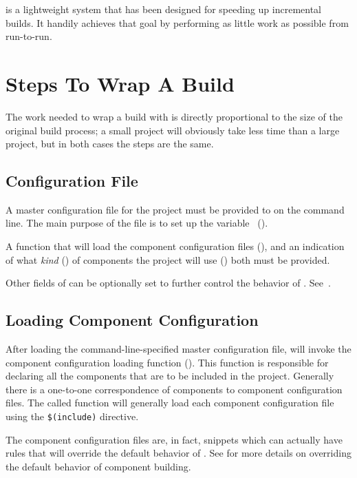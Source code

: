 \lmsbw is a lightweight system that has been designed for speeding up
incremental builds.  It handily achieves that goal by performing as
little work as possible from run-to-run.

\section{Steps To Wrap A Build}

The work needed to wrap a build with \lmsbw is directly proportional
to the size of the original build process; a small project will
obviously take less time than a large project, but in both cases the
steps are the same.

\subsection{Configuration File}

A master configuration file for the project must be provided to \lmsbw
on the command line.  The main purpose of the file is to set up the
\lmsbwconfiguration variable~ ().

A \gnumake function that will load the component configuration files
(), and an indication of
what \emph{kind} () of components the project
will use () both must be
provided.

Other fields of \lmsbwconfiguration can be optionally set to further
control the behavior of \lmsbw.
See~.

\subsection{Loading Component Configuration}

After loading the command-line-specified master configuration file,
\lmsbw will invoke the component configuration loading function
().  This function is
responsible for declaring all the components that are to be included
in the project.  Generally there is a one-to-one correspondence of
components to component configuration files.  The called function will
generally load each component configuration file using the \gnumake
\texttt{\$(include)} directive.

The component configuration files are, in fact, \makefile snippets
which can actually have rules that will override the default behavior
of \lmsbw.  See  for more details on overriding
the default behavior of component building.

